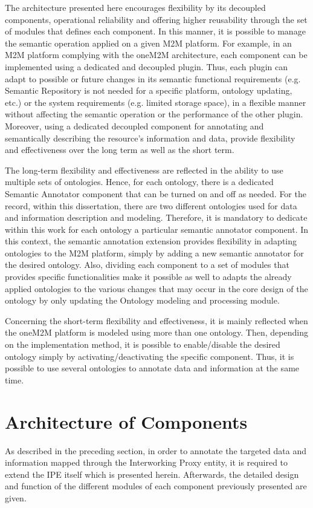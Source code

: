 The architecture presented here encourages flexibility by its decoupled components, operational reliability and offering higher reusability through the set of modules that defines each component. In this manner, it is possible to manage the semantic operation applied on a given M2M platform. For example, in an M2M platform complying with the oneM2M architecture, each component can be implemented using a dedicated and decoupled plugin. Thus, each plugin can adapt to possible or future changes in its semantic functional requirements (e.g. Semantic Repository is not needed for a specific platform, ontology updating, etc.) or the system requirements (e.g. limited storage space), in a flexible manner without affecting the semantic operation or the performance of the other plugin. Moreover, using a dedicated decoupled component for annotating and semantically describing the resource’s information and data, provide flexibility and effectiveness over the long term as well as the short term. \par
The long-term flexibility and effectiveness are reflected in the ability to use multiple sets of ontologies. Hence, for each ontology, there is a dedicated Semantic Annotator component that can be turned on and off as needed. For the record, within this dissertation, there are two different ontologies used for data and information description and modeling. Therefore, it is mandatory to dedicate within this work for each ontology a particular semantic annotator component. In this context, the semantic annotation extension provides flexibility in adapting ontologies to the M2M platform, simply by adding a new semantic annotator for the desired ontology. Also, dividing each component to a set of modules that provides specific functionalities make it possible as well to adapts the already applied ontologies to the various changes that may occur in the core design of the ontology by only updating the Ontology modeling and processing module.    \par
Concerning the short-term flexibility and effectiveness, it is mainly reflected when the oneM2M platform is modeled using more than one ontology. Then, depending on the implementation method, it is possible to enable/disable the desired ontology simply by activating/deactivating the specific component. Thus, it is possible to use several ontologies to annotate data and information at the same time. \par 

\section{Architecture of Components }
As described in the preceding section, in order to annotate the targeted data and information mapped through the Interworking Proxy entity, it is required to extend the IPE itself which is presented herein. Afterwards, the detailed design and function of the different modules of each component previously presented are given. 
